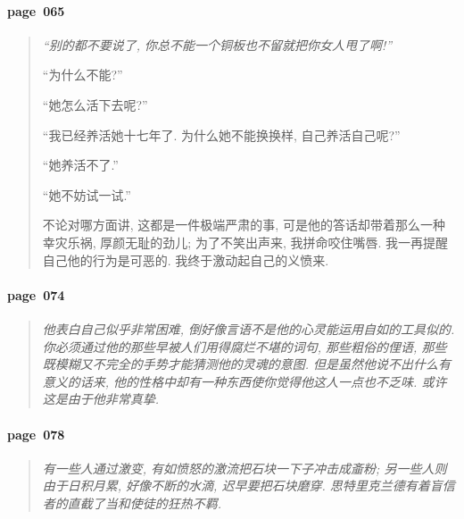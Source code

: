 \paragraph*{page~065}
\begin{quotation}
    \itshape
    ``别的都不要说了, 你总不能一个铜板也不留就把你女人甩了啊!''

    ``为什么不能?''

    ``她怎么活下去呢?''

    ``我已经养活她十七年了. 为什么她不能换换样, 自己养活自己呢?''

    ``她养活不了.''

    ``她不妨试一试.''

    不论对哪方面讲, 这都是一件极端严肃的事, 可是他的答话却带着那么一种幸灾乐祸, 厚颜无耻的劲儿; 为了不笑出声来, 我拼命咬住嘴唇. 我一再提醒自己他的行为是可恶的. 我终于激动起自己的义愤来. 
\end{quotation}

\paragraph*{page~074}
\begin{quotation}
    \itshape
    他表白自己似乎非常困难, 倒好像言语不是他的心灵能运用自如的工具似的. 你必须通过他的那些早被人们用得腐烂不堪的词句, 那些粗俗的俚语, 那些既模糊又不完全的手势才能猜测他的灵魂的意图. 但是虽然他说不出什么有意义的话来, 他的性格中却有一种东西使你觉得他这人一点也不乏味. 或许这是由于他非常真挚.
\end{quotation}

\paragraph*{page~078}
\begin{quotation}
    \itshape
    有一些人通过激变, 有如愤怒的激流把石块一下子冲击成齑粉; 另一些人则由于日积月累, 好像不断的水滴, 迟早要把石块磨穿. 思特里克兰德有着盲信者的直截了当和使徒的狂热不羁. 
\end{quotation}

